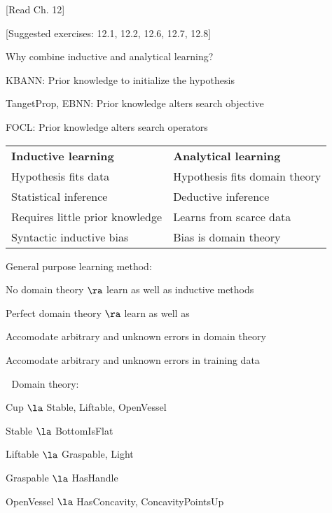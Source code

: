 
 \bk


\centerline{[Read Ch. 12]}
\centerline{[Suggested exercises: 12.1, 12.2, 12.6, 12.7, 12.8]}

\bi
\item Why combine inductive and analytical learning?
\item KBANN: Prior knowledge to initialize the hypothesis
\item TangetProp, EBNN: Prior knowledge alters search objective
\item FOCL: Prior knowledge alters search operators
\ei


 \bk
\begin{tabular}{ll} 
 {\bf Inductive learning} & {\bf Analytical learning} \\
 Hypothesis fits data & Hypothesis fits domain theory \\
 Statistical inference & Deductive inference \\
 Requires little prior knowledge & Learns from scarce data  \\
 Syntactic inductive bias & Bias is domain theory \\
\end{tabular}


 \bk

\centerline{\hbox{}}

\bigskip

\bigskip

General purpose learning method:
\bi
\item No domain theory $\ra$ learn as well as inductive methods
\item Perfect domain theory $\ra$ learn as well as 
\item Accomodate arbitrary and unknown errors in domain theory
\item Accomodate arbitrary and unknown errors in training data
\ei

\newpage
Domain theory:
\begin{center}
 Cup $\la$ Stable, Liftable, OpenVessel

 Stable $\la$ BottomIsFlat

 Liftable $\la$ Graspable, Light

 Graspable $\la$ HasHandle

 OpenVessel $\la$ HasConcavity, ConcavityPointsUp
\end{center}

